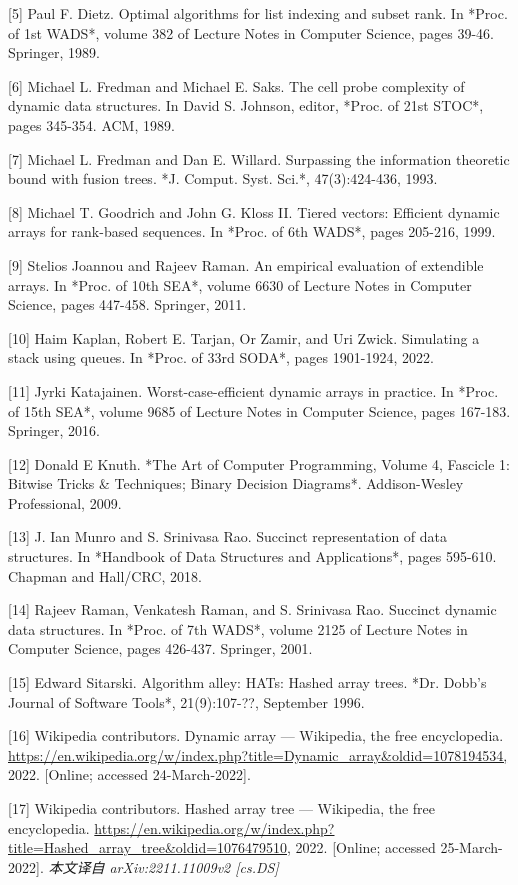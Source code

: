 \documentclass[12pt,a4paper]{ctexart}
\theoremstyle{remark}
\begin{document}
[5] Paul F. Dietz. Optimal algorithms for list indexing and subset rank. In *Proc. of 1st WADS*, volume 382 of Lecture Notes in Computer Science, pages 39-46. Springer, 1989.

[6] Michael L. Fredman and Michael E. Saks. The cell probe complexity of dynamic data structures. In David S. Johnson, editor, *Proc. of 21st STOC*, pages 345-354. ACM, 1989.

[7] Michael L. Fredman and Dan E. Willard. Surpassing the information theoretic bound with fusion trees. *J. Comput. Syst. Sci.*, 47(3):424-436, 1993.

[8] Michael T. Goodrich and John G. Kloss II. Tiered vectors: Efficient dynamic arrays for rank-based sequences. In *Proc. of 6th WADS*, pages 205-216, 1999.

[9] Stelios Joannou and Rajeev Raman. An empirical evaluation of extendible arrays. In *Proc. of 10th SEA*, volume 6630 of Lecture Notes in Computer Science, pages 447-458. Springer, 2011.

[10] Haim Kaplan, Robert E. Tarjan, Or Zamir, and Uri Zwick. Simulating a stack using queues. In *Proc. of 33rd SODA*, pages 1901-1924, 2022.

[11] Jyrki Katajainen. Worst-case-efficient dynamic arrays in practice. In *Proc. of 15th SEA*, volume 9685 of Lecture Notes in Computer Science, pages 167-183. Springer, 2016.

[12] Donald E Knuth. *The Art of Computer Programming, Volume 4, Fascicle 1: Bitwise Tricks & Techniques; Binary Decision Diagrams*. Addison-Wesley Professional, 2009.

[13] J. Ian Munro and S. Srinivasa Rao. Succinct representation of data structures. In *Handbook of Data Structures and Applications*, pages 595-610. Chapman and Hall/CRC, 2018.

[14] Rajeev Raman, Venkatesh Raman, and S. Srinivasa Rao. Succinct dynamic data structures. In *Proc. of 7th WADS*, volume 2125 of Lecture Notes in Computer Science, pages 426-437. Springer, 2001.

[15] Edward Sitarski. Algorithm alley: HATs: Hashed array trees. *Dr. Dobb's Journal of Software Tools*, 21(9):107-??, September 1996.

[16] Wikipedia contributors. Dynamic array --- Wikipedia, the free encyclopedia. \url{https://en.wikipedia.org/w/index.php?title=Dynamic_array&oldid=1078194534,} 2022. [Online; accessed 24-March-2022].

[17] Wikipedia contributors. Hashed array tree --- Wikipedia, the free encyclopedia. \url{https://en.wikipedia.org/w/index.php?title=Hashed_array_tree&oldid=1076479510,} 2022. [Online; accessed 25-March-2022].
\medskip
\textit{本文译自 arXiv:2211.11009v2 [cs.DS]}
\end{document}
